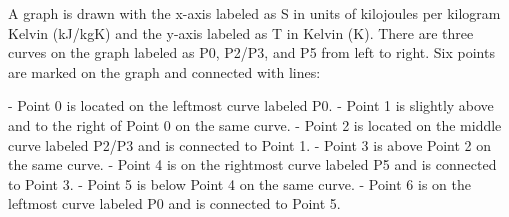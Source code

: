 A graph is drawn with the x-axis labeled as S in units of kilojoules per kilogram Kelvin (kJ/kgK) and the y-axis labeled as T in Kelvin (K). There are three curves on the graph labeled as P0, P2/P3, and P5 from left to right. Six points are marked on the graph and connected with lines:

- Point 0 is located on the leftmost curve labeled P0.
- Point 1 is slightly above and to the right of Point 0 on the same curve.
- Point 2 is located on the middle curve labeled P2/P3 and is connected to Point 1.
- Point 3 is above Point 2 on the same curve.
- Point 4 is on the rightmost curve labeled P5 and is connected to Point 3.
- Point 5 is below Point 4 on the same curve.
- Point 6 is on the leftmost curve labeled P0 and is connected to Point 5.